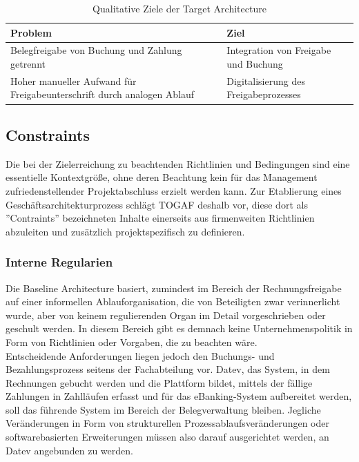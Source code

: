 \begin{table}[!htb]
\centering
\caption{Qualitative Ziele der Target Architecture}
\label{Qualitative Ziele der Target Architecture}
\begin{tabular}{|p{8cm}|p{8cm}|}
\hline
\rowcolor[HTML]{EFEFEF} 
{\color[HTML]{000000} \textbf{Problem}}                                & {\color[HTML]{000000} \textbf{Ziel}}  \\ \hline
\rowcolor[HTML]{FFFFFF} 
Belegfreigabe von Buchung und Zahlung getrennt                         & Integration von Freigabe und Buchung  \\ \hline
Hoher manueller Aufwand für Freigabeunterschrift durch analogen Ablauf & Digitalisierung des Freigabeprozesses \\ \hline
\end{tabular}
\end{table}



\subsection{Constraints}
Die bei der Zielerreichung zu beachtenden Richtlinien und Bedingungen sind eine essentielle Kontextgröße, ohne deren Beachtung kein für das Management zufriedenstellender Projektabschluss erzielt werden kann. 
Zur Etablierung eines Geschäftsarchitekturprozess schlägt TOGAF deshalb vor, diese dort als ''Contraints'' bezeichneten Inhalte einerseits aus firmenweiten Richtlinien abzuleiten und zusätzlich projektspezifisch zu definieren.
\subsubsection{Interne Regularien}
Die Baseline Architecture basiert, zumindest im Bereich der Rechnungsfreigabe auf einer informellen Ablauforganisation, die von Beteiligten zwar verinnerlicht wurde, aber von keinem regulierenden Organ im Detail vorgeschrieben oder geschult werden.
In diesem Bereich gibt es demnach keine Unternehmenspolitik in Form von Richtlinien oder Vorgaben, die zu beachten wäre.\\
Entscheidende Anforderungen liegen jedoch den Buchungs- und Bezahlungsprozess seitens der Fachabteilung vor.
Datev, das System, in dem Rechnungen gebucht werden und die Plattform bildet, mittels der fällige Zahlungen in Zahlläufen erfasst und für das eBanking-System aufbereitet werden, soll das führende System im Bereich der Belegverwaltung bleiben.
Jegliche Veränderungen in Form von strukturellen Prozessablaufsveränderungen oder softwarebasierten Erweiterungen müssen also darauf ausgerichtet werden, an Datev angebunden zu werden.
  
